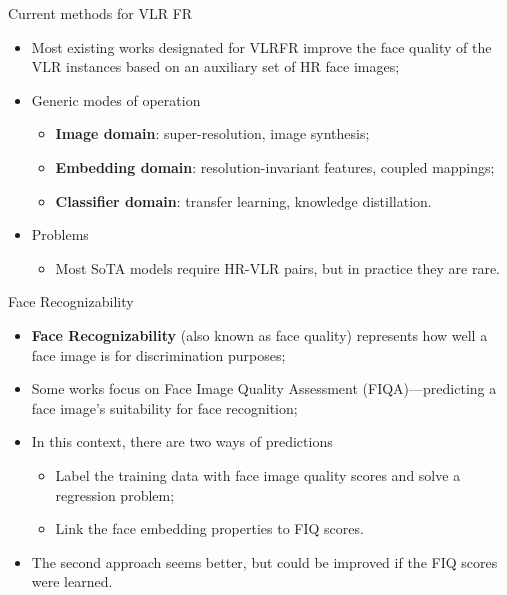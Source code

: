 \documentclass[aspectratio=169,xcolor=dvipsnames]{beamer}
\begin{document}

\begin{frame}{Current methods for VLR FR}
    \begin{itemize}
        \item Most existing works designated for VLRFR improve the face quality of the VLR instances based on an auxiliary set of HR face images;
        \item Generic modes of operation
        \begin{itemize}
            \item \textbf{Image domain}: super-resolution, image synthesis;
            \item \textbf{Embedding domain}: resolution-invariant features, coupled mappings;
            \item \textbf{Classifier domain}: transfer learning, knowledge distillation.
        \end{itemize}
        \item Problems
        \begin{itemize}
            \item Most SoTA models require HR-VLR pairs, but in practice they are rare.
        \end{itemize}
    \end{itemize}
\end{frame}


\begin{frame}{Face Recognizability}
    \begin{itemize}
        \item \textbf{Face Recognizability} (also known as face quality) represents how well a face image is for discrimination purposes;%
        \item Some works focus on Face Image Quality Assessment (FIQA)---predicting a face image's suitability for face recognition;
        \item In this context, there are two ways of predictions
        \begin{itemize}
            \item Label the training data with face image quality scores and solve a regression problem;
            \item Link the face embedding properties to FIQ scores.
        \end{itemize}
        \item The second approach seems better, but could be improved if the FIQ scores were learned.
    \end{itemize}
\end{frame}
\end{document}
